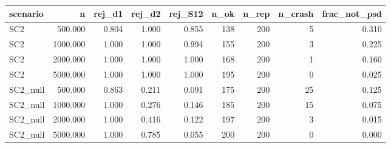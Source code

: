 \begin{tabular}{lrrrrrrrr}
  \hline
scenario & n & rej\_d1 & rej\_d2 & rej\_S12 & n\_ok & n\_rep & n\_crash & frac\_not\_psd \\ 
  \hline
SC2 & 500.000 & 0.804 & 1.000 & 0.855 &  138 &  200 &    5 & 0.310 \\ 
  SC2 & 1000.000 & 1.000 & 1.000 & 0.994 &  155 &  200 &    3 & 0.225 \\ 
  SC2 & 2000.000 & 1.000 & 1.000 & 1.000 &  168 &  200 &    1 & 0.160 \\ 
  SC2 & 5000.000 & 1.000 & 1.000 & 1.000 &  195 &  200 &    0 & 0.025 \\ 
  SC2\_null & 500.000 & 0.863 & 0.211 & 0.091 &  175 &  200 &   25 & 0.125 \\ 
  SC2\_null & 1000.000 & 1.000 & 0.276 & 0.146 &  185 &  200 &   15 & 0.075 \\ 
  SC2\_null & 2000.000 & 1.000 & 0.416 & 0.122 &  197 &  200 &    3 & 0.015 \\ 
  SC2\_null & 5000.000 & 1.000 & 0.785 & 0.055 &  200 &  200 &    0 & 0.000 \\ 
   \hline
\end{tabular}
